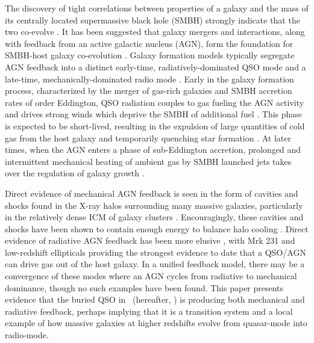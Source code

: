 \documentclass[useAMS,usenatbib]{mn2e}
\begin{document}
The discovery of tight correlations between properties of a galaxy and
the mass of its centrally located supermassive black hole (SMBH)
strongly indicate that the two co-evolve
\citep[\eg][]{1995ARA&A..33..581K, magorrian}. It has been suggested
that galaxy mergers and interactions, along with feedback from an
active galactic nucleus (AGN), form the foundation for SMBH-host
galaxy co-evolution \citep[\eg][]{2000MNRAS.311..576K}. Galaxy
formation models typically segregate AGN feedback into a distinct
early-time, radiatively-dominated QSO mode
\citep[\eg][]{2005Natur.435..629S} and a late-time,
mechanically-dominated radio mode \citep[\eg][]{croton06,
  bower06}. Early in the galaxy formation process, characterized by
the merger of gas-rich galaxies and SMBH accretion rates of order
Eddington, QSO radiation couples to gas fueling the AGN activity and
drives strong winds which deprive the SMBH of additional fuel
\citep[\eg][]{1998A&A...331L...1S}. This phase is expected to be
short-lived, resulting in the expulsion of large quantities of cold gas
from the host galaxy and temporarily quenching star formation
\citep{2006ApJ...642L.107N}. At later times, when the AGN enters a
phase of sub-Eddington accretion, prolonged and intermittent
mechanical heating of ambient gas by SMBH launched jets takes over the
regulation of galaxy growth \citep[see][for a review]{mcnamrev}.

Direct evidence of mechanical AGN feedback is seen in the form of
cavities and shocks found in the X-ray halos surrounding many massive
galaxies, particularly in the relatively dense ICM of galaxy clusters
\citep[\eg][]{perseus1, 2000ApJ...534L.135M}.  Encouragingly, these
cavities and shocks have been shown to contain enough energy to
balance halo cooling \citep{birzan04, 2005MNRAS.364.1343D, herca,
  ms0735, rafferty06}. Direct evidence of radiative AGN feedback has
been more elusive \citep[see][for a review]{2005ARA&A..43..769V}, with
Mrk 231 \citep{2010arXiv1006.1655F} and low-redshift ellipticals
\citep{2009ApJ...690.1672S} providing the strongest evidence to date
that a QSO/AGN can drive gas out of the host galaxy. In a unified
feedback model, there may be a convergence of these modes where an AGN
cycles from radiative to mechanical dominance, though no such examples
have been found. This paper presents evidence that the buried QSO in
\inine\ (hereafter, \irs) is producing both mechanical and radiative
feedback, perhaps implying that it is a transition system and a local
example of how massive galaxies at higher redshifts evolve from
quasar-mode into radio-mode.
\end{document}
